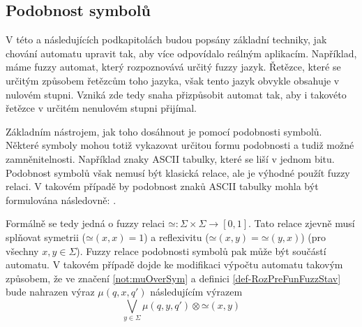 \documentclass[a4paper,10pt]{article}
\begin{document}
%     
%     
% 
% 

\subsection{Podobnost symbolů}
V této a následujících podkapitolách budou popsány základní techniky, jak chování automatu upravit tak, aby více odpovídalo reálným aplikacím. Například, máme fuzzy automat, který rozpoznovává určitý fuzzy jazyk. Řetězce, které se určitým způsobem  řetězcům toho jazyka, však tento jazyk obvykle obsahuje v nulovém stupni. Vzniká zde tedy snaha přizpůsobit automat tak, aby i takovéto řetězce v určitém nenulovém stupni přijímal.

Základním nástrojem, jak toho dosáhnout je pomocí podobnosti symbolů. Některé symboly mohou totiž vykazovat určitou formu podobnosti a tudiž možné zamněnitelnosti. Například znaky ASCII tabulky, které se liší v jednom bitu. Podobnost symbolů však nemusí být klasická  relace, ale je výhodné použít fuzzy relaci. V takovém případě by podobnost znaků ASCII tabulky mohla být formulována následovně: .

Formálně se tedy jedná o fuzzy relaci $\mathbin{\simeq}: \Sigma \times \Sigma \rightarrow [0, 1]$. Tato relace zjevně musí splňovat symetrii ($\mathbin{\simeq}(x, x) = 1$) a reflexivitu ($\mathbin{\simeq}(x, y) = \mathbin{\simeq}(y, x)$) (pro všechny $x, y \in \Sigma$). Fuzzy relace podobnosti symbolů pak může být součástí automatu. V takovém případě dojde ke modifikaci výpočtu automatu takovým způsobem, že ve značení \ref{not:muOverSym} a definici \ref{def-RozPreFunFuzzStav} bude nahrazen výraz $\mu(q, x, q')$ následujícím výrazem
$$
  \bigvee_{y \in \Sigma} \mu(q, y, q') \otimes \mathbin{\simeq}(x, y)
$$
\end{document}
